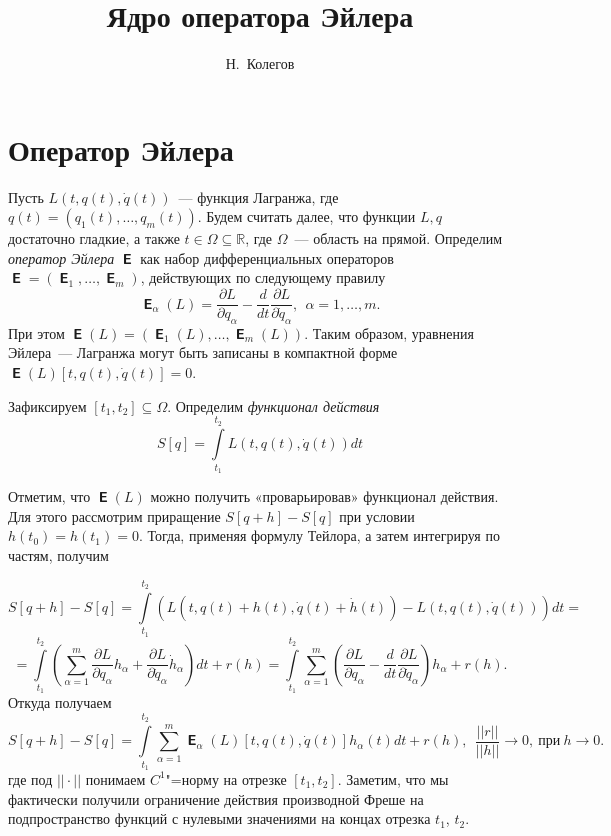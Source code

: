 \documentclass[11pt,a4paper]{article}
\theoremstyle{definition}
\numberwithin{equation}{section}
\def\R{{\mathbb R}}
\begin{document}
\author{Н.~Колегов}
\title{Ядро оператора Эйлера}
\maketitle
\section{Оператор Эйлера}
Пусть $L(t,q(t),\dot{q}(t))$~— функция Лагранжа, где $q(t)=(q_1(t),\ldots,
q_m(t))$. Будем считать далее, что функции $L,q$ достаточно гладкие, а также
$t\in\Omega\subseteq\R$, где $\Omega$~— область на прямой. Определим {\em
оператор Эйлера} $\mbfsansE$ как набор дифференциальных операторов $\mbfsansE=(\mbfsansE_1,\ldots,
\mbfsansE_m)$, действующих по следующему правилу
$$\mbfsansE_\alpha(L)=\dfrac{\partial L}{\partial q_\alpha}-\dfrac{d}{dt}\dfrac{\partial L}{\partial\dot{q}_\alpha},~~\alpha=1,\ldots,m.$$
При этом $\mbfsansE(L)=(\mbfsansE_1(L),\ldots,\mbfsansE_m(L))$. Таким образом, уравнения Эйлера~— Лагранжа могут быть записаны в компактной форме $\mbfsansE(L)[t,q(t),\dot{q}(t)]=0$.

Зафиксируем $[t_1,t_2]\subseteq\Omega$. Определим {\em функционал действия}
\begin{equation} \label{eq1}
S[q]=\int\limits_{t_1}^{t_2} L(t,q(t),\dot{q}(t))dt
\end{equation}


Отметим, что $\mbfsansE(L)$ можно получить «проварьировав» функционал действия. Для этого рассмотрим приращение $S[q+h]-S[q]$ при условии $h(t_0)=h(t_1)=0$. Тогда, применяя формулу Тейлора, а затем интегрируя по частям, получим

$$S[q+h]-S[q]=\int\limits_{t_1}^{t_2}\left( L(t,q(t)+h(t),\dot{q}(t)+\dot{h}(t))-L(t,q(t),\dot{q}(t))\right) dt= $$
$$=\int\limits_{t_1}^{t_2}\left( \sum\limits_{\alpha=1}^m\dfrac{\partial L}{\partial q_\alpha}h_\alpha+\dfrac{\partial L}{\partial\dot{q}_\alpha}\dot{h}_\alpha\right) dt +r(h)=\int\limits_{t_1}^{t_2}\sum\limits_{\alpha=1}^m\left( \dfrac{\partial L}{\partial q_\alpha}-\dfrac{d}{dt}\dfrac{\partial L}{\partial\dot{q}_\alpha}\right)h_\alpha+r(h).$$
Откуда получаем
\begin{equation}\label{eq2}
S[q+h]-S[q]=\int\limits_{t_1}^{t_2}\sum\limits_{\alpha=1}^m \mbfsansE_\alpha(L)[t,q(t),\dot{q}(t)]h_\alpha(t)dt +r(h),~~\dfrac{||r||}{||h||}\rightarrow 0, ~\text{при}~h\rightarrow 0.
\end{equation}
где под $||\cdot||$ понимаем $C^1$"=норму на отрезке $[t_1,t_2]$.
Заметим, что мы фактически получили ограничение действия производной Фреше на подпространство функций с нулевыми значениями на концах отрезка $t_1$, $t_2$.
\end{document}
